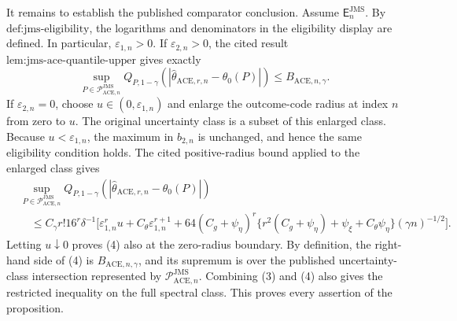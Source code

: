 It remains to establish the published comparator conclusion.  Assume
\(\mathsf E_n^{\mathrm{JMS}}\).  By
\(\text{def:jms-eligibility}\), the logarithms and denominators in the
eligibility display are defined.  In particular, \(\varepsilon_{1,n}>0\).
If \(\varepsilon_{2,n}>0\), the cited result
\(\text{lem:jms-ace-quantile-upper}\) gives exactly
\[
 \sup_{P\in\mathcal P_{\mathrm{ACE},n}^{\mathrm{JMS}}}
 Q_{P,1-\gamma}
 \!\left(|\widehat\theta_{\mathrm{ACE},r,n}-\theta_0(P)|\right)
 \le B_{\mathrm{ACE},n,\gamma}.                         \tag{4}
\]
If \(\varepsilon_{2,n}=0\), choose
\(u\in(0,\varepsilon_{1,n})\) and enlarge the outcome-code radius at
index \(n\) from zero to \(u\).  The original uncertainty class is a
subset of this enlarged class.  Because \(u<\varepsilon_{1,n}\), the
maximum in \(b_{2,n}\) is unchanged, and hence the same eligibility
condition holds.  The cited positive-radius bound applied to the enlarged
class gives
\[
 \begin{aligned}
 &\sup_{P\in\mathcal P_{\mathrm{ACE},n}^{\mathrm{JMS}}}
 Q_{P,1-\gamma}
 \!\left(|\widehat\theta_{\mathrm{ACE},r,n}-\theta_0(P)|\right)\\
 &\quad\le C_{\gamma}r!16^r\delta^{-1}
 \Big[\varepsilon_{1,n}^r u+C_{\theta}\varepsilon_{1,n}^{r+1}
 +64(C_g+\psi_{\eta})^r
 \{r^2(C_g+\psi_{\eta})+\psi_{\xi}+C_{\theta}\psi_{\eta}\}
 (\gamma n)^{-1/2}\Big].
 \end{aligned}
\]
Letting \(u\downarrow0\) proves (4) also at the zero-radius boundary.
By definition, the right-hand side of (4) is
\(B_{\mathrm{ACE},n,\gamma}\), and its supremum is over the published
uncertainty-class intersection represented by
\(\mathcal P_{\mathrm{ACE},n}^{\mathrm{JMS}}\).  Combining (3) and (4)
also gives the restricted inequality on the full spectral class.  This
proves every assertion of the proposition.
